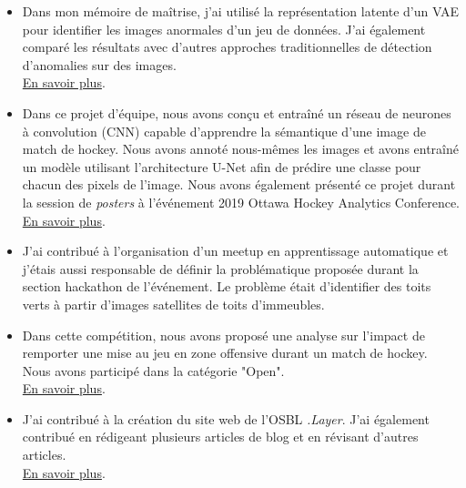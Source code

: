 \begin{itemize}
\item Dans mon mémoire de maîtrise, j'ai utilisé la représentation latente d'un VAE pour identifier les images anormales d'un jeu de données. J'ai également comparé les résultats avec d'autres approches traditionnelles de détection d'anomalies sur des images. \\ \href{https://github.com/stecaron/deep-stat-thesis/blob/master/rapports/main-memoire.pdf}{En savoir plus}.
\end{itemize}
\smallskip
{}
\begin{itemize}
\item Dans ce projet d'équipe, nous avons conçu et entraîné un réseau de neurones à convolution (CNN) capable d'apprendre la sémantique d'une image de match de hockey. Nous avons annoté nous-mêmes les images et avons entraîné un modèle utilisant l'architecture U-Net afin de prédire une classe pour chacun des pixels de l'image. Nous avons également présenté ce projet durant la session de \textit{posters} à l'événement 2019 Ottawa Hockey Analytics Conference. \\ \href{https://github.com/stecaron/glo-7030-projet/blob/master/pancarte/main-pancarte.pdf}{En savoir plus}.
\end{itemize}
\smallskip
{}
\begin{itemize}
\item J'ai contribué à l'organisation d'un meetup en apprentissage automatique et j'étais aussi responsable de définir la problématique proposée durant la section hackathon de l'événement. Le problème était d'identifier des toits verts à partir d'images satellites de toits d'immeubles.
\end{itemize}
\smallskip
{}
\begin{itemize}
\item Dans cette compétition, nous avons proposé une analyse sur l'impact de remporter une mise au jeu en zone offensive durant un match de hockey. Nous avons participé dans la catégorie "Open".  \\ \href{https://github.com/dot-layer/bigdatacup-2021/blob/main/report/CaronLeCavalierPerreault-BigDataCup2021.pdf}{En savoir plus}.
\end{itemize}
\smallskip
{}
\begin{itemize}
\item J'ai contribué à la création du site web de l'OSBL \textit{.Layer}. J'ai également contribué en rédigeant plusieurs articles de blog et en révisant d'autres articles. \\ \href{https://www.dotlayer.org/}{En savoir plus}.
\end{itemize}
\smallskip
